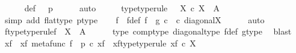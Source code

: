 \begin{isabellebody}
\ \ \isamarkupfalse%
\ {\isasymphi}\ \ {\isasymphi}{\isacharunderscore}{\kern0pt}def{\isacharcolon}{\kern0pt}\ {\isachardoublequoteopen}{\isasymphi}\ {\isacharequal}{\kern0pt}\ p\isactrlsup {\isasymflat}{\isachardoublequoteclose}\isanewline
\ \ \ \ \isamarkupfalse%
\ auto\isanewline
\ \ \isamarkupfalse%
\ \isamarkupfalse%
\ {\isasymphi}{\isacharunderscore}{\kern0pt}type{\isacharbrackleft}{\kern0pt}type{\isacharunderscore}{\kern0pt}rule{\isacharbrackright}{\kern0pt}{\isacharcolon}{\kern0pt}\ {\isachardoublequoteopen}{\isasymphi}\ {\isacharcolon}{\kern0pt}\ X\ {\isasymtimes}\isactrlsub c\ X\ {\isasymrightarrow}\ A{\isachardoublequoteclose}\isanewline
\ \ \ \ \isamarkupfalse%
\ {\isacharparenleft}{\kern0pt}simp\ add{\isacharcolon}{\kern0pt}\ flat{\isacharunderscore}{\kern0pt}type\ p{\isacharunderscore}{\kern0pt}type{\isacharparenright}{\kern0pt}\isanewline
\ \ \isamarkupfalse%
\ f\ \ f{\isacharunderscore}{\kern0pt}def{\isacharcolon}{\kern0pt}\ {\isachardoublequoteopen}f\ {\isacharequal}{\kern0pt}\ g\ {\isasymcirc}\isactrlsub c\ {\isasymphi}\ {\isasymcirc}\isactrlsub c\ diagonal{\isacharparenleft}{\kern0pt}X{\isacharparenright}{\kern0pt}{\isachardoublequoteclose}\isanewline
\ \ \ \ \isamarkupfalse%
\ auto\isanewline
\ \ \isamarkupfalse%
\ \isamarkupfalse%
\ f{\isacharunderscore}{\kern0pt}type{\isacharbrackleft}{\kern0pt}type{\isacharunderscore}{\kern0pt}rule{\isacharbrackright}{\kern0pt}{\isacharcolon}{\kern0pt}{\isachardoublequoteopen}f\ {\isacharcolon}{\kern0pt}\ X\ {\isasymrightarrow}\ A{\isachardoublequoteclose}\isanewline
\ \ \ \ \isamarkupfalse%
\ {\isasymphi}{\isacharunderscore}{\kern0pt}type\ comp{\isacharunderscore}{\kern0pt}type\ diagonal{\isacharunderscore}{\kern0pt}type\ f{\isacharunderscore}{\kern0pt}def\ g{\isacharunderscore}{\kern0pt}type\ \isamarkupfalse%
\ blast\isanewline
\ \ \isamarkupfalse%
\ x{\isacharunderscore}{\kern0pt}f\ \ x{\isacharunderscore}{\kern0pt}f{\isacharcolon}{\kern0pt}\ {\isachardoublequoteopen}metafunc\ f\ {\isacharequal}{\kern0pt}\ p\ {\isasymcirc}\isactrlsub c\ x{\isacharunderscore}{\kern0pt}f{\isachardoublequoteclose}\ \ x{\isacharunderscore}{\kern0pt}f{\isacharunderscore}{\kern0pt}type{\isacharbrackleft}{\kern0pt}type{\isacharunderscore}{\kern0pt}rule{\isacharbrackright}{\kern0pt}{\isacharcolon}{\kern0pt}\ {\isachardoublequoteopen}x{\isacharunderscore}{\kern0pt}f\ {\isasymin}\isactrlsub c\ X{\isachardoublequoteclose}\isanewline

\end{isabellebody}
